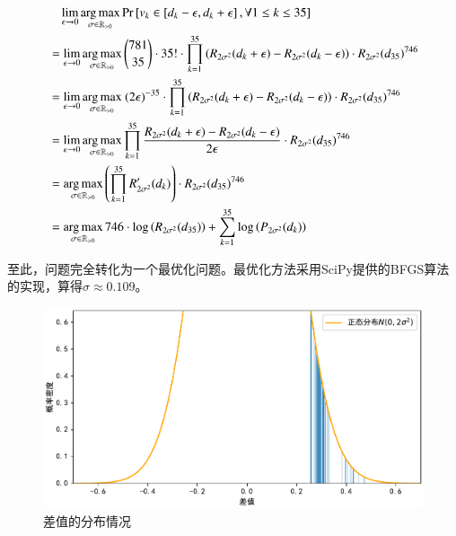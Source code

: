             \begin{align*}
                &\phantom{=\ }\lim\limits_{\epsilon\to 0} \argmax\limits_{\sigma\in\mathbb{R}_{>0}} \mathrm{Pr}\left[v_k\in\left[d_k-\epsilon,d_k+\epsilon\right],\forall 1\leq k\leq 35\right] \\
                &=\lim\limits_{\epsilon\to 0} \argmax\limits_{\sigma\in\mathbb{R}_{>0}} \binom{781}{35}\cdot 35!\cdot\prod\limits_{k=1}^{35} \left(R_{2\sigma^2}(d_k+\epsilon)-R_{2\sigma^2}(d_k-\epsilon)\right)\cdot R_{2\sigma^2}(d_{35})^{746} \\
                &=\lim\limits_{\epsilon\to 0} \argmax\limits_{\sigma\in\mathbb{R}_{>0}} \ (2\epsilon)^{-35}\cdot\prod\limits_{k=1}^{35} \left(R_{2\sigma^2}(d_k+\epsilon)-R_{2\sigma^2}(d_k-\epsilon)\right)\cdot R_{2\sigma^2}(d_{35})^{746} \\
                &=\lim\limits_{\epsilon\to 0} \argmax\limits_{\sigma\in\mathbb{R}_{>0}} \prod\limits_{k=1}^{35} \frac{R_{2\sigma^2}(d_k+\epsilon)-R_{2\sigma^2}(d_k-\epsilon)}{2\epsilon}\cdot R_{2\sigma^2}(d_{35})^{746} \\
                &=\argmax\limits_{\sigma\in\mathbb{R}_{>0}} \left(\prod\limits_{k=1}^{35} R^\prime_{2\sigma^2}(d_k)\right)\cdot R_{2\sigma^2}(d_{35})^{746} \\
                &=\argmax\limits_{\sigma\in\mathbb{R}_{>0}} 746\cdot\log\left(R_{2\sigma^2}(d_{35})\right)+\sum\limits_{k=1}^{35} \log\left(P_{2\sigma^2}(d_k)\right) 
            \end{align*}

            至此，问题完全转化为一个最优化问题。最优化方法采用SciPy提供的BFGS算法的实现\cite{scipy_minimize}，算得$\sigma\approx 0.109$。

            \begin{figure}
                \centering
                \includegraphics[width=\textwidth]{fig/plottingNormalDistriOfDifference.pdf}
                \caption{差值的分布情况}
                \label{fig:distriOfDifference}
            \end{figure}

